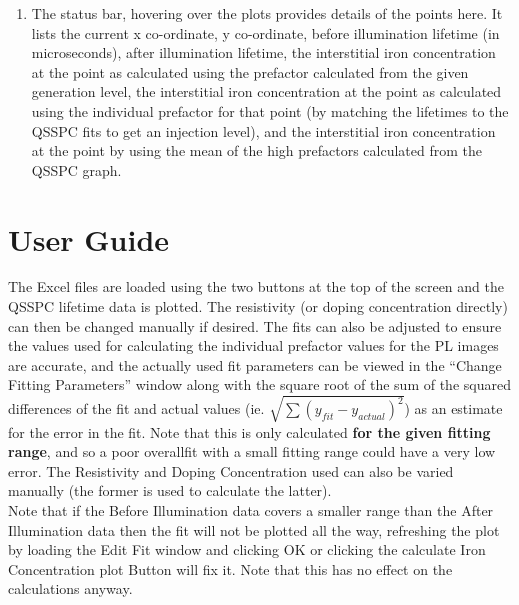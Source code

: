\documentclass[final,a4paper,oneside,12pt]{article}
\begin{document}
\begin{enumerate}
\item The status bar, hovering over the plots provides details of the points here. It lists the current x co-ordinate, y co-ordinate, before illumination lifetime (in microseconds), after illumination lifetime, the interstitial iron concentration at the point as calculated using the prefactor calculated from the given generation level, the interstitial iron concentration at the point as calculated using the individual prefactor for that point (by matching the lifetimes to the QSSPC fits to get an injection level), and the interstitial iron concentration at the point by using the mean of the high prefactors calculated from the QSSPC graph.
\end{enumerate}


\section{User Guide}
The Excel files are loaded using the two buttons at the top of the screen and the QSSPC lifetime data is plotted. The resistivity (or doping concentration directly) can then be changed manually if desired. The fits can also be adjusted to ensure the values used for calculating the individual prefactor values for the PL images are accurate, and the actually used fit parameters can be viewed in the ``Change Fitting Parameters'' window along with the square root of the sum of the squared differences of the fit and actual values (ie. $\sqrt{\sum (y_{fit} - y_{actual})^{2}}$) as an estimate for the error in the fit. Note that this is only calculated {\bf for the given fitting range}, and so a poor overallfit with a small fitting range could have a very low error. The Resistivity and Doping Concentration used can also be varied manually (the former is used to calculate the latter).\\

Note that if the Before Illumination data covers a smaller range than the After Illumination data then the fit will not be plotted all the way, refreshing the plot by loading the Edit Fit window and clicking OK or clicking the calculate Iron Concentration plot Button will fix it. Note that this has no effect on the calculations anyway.\\
\end{document}
